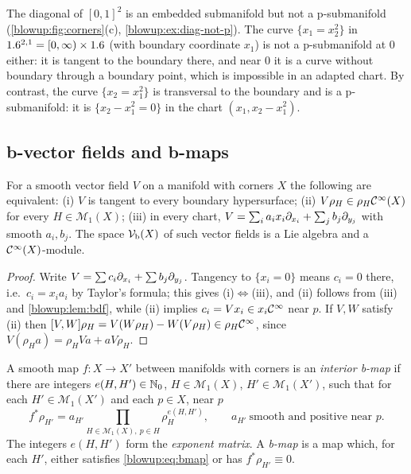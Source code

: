 \begin{example}
The diagonal of $[0,1]^2$ is an embedded submanifold but not a p-submanifold
(\cref{blowup:fig:corners}(c), \cref{blowup:ex:diag-not-p}). The curve $\{x_1=x_2^2\}$ in
$1.6^{2,1}=[0,\infty)\times1.6$ (with boundary coordinate $x_1$) is not a p-submanifold
at $0$ either: it is tangent to the boundary there, and near $0$ it is a curve without
boundary through a boundary point, which is impossible in an adapted chart. By contrast,
the curve $\{x_2=x_1^2\}$ is transversal to the boundary and is a p-submanifold: it is
$\{x_2-x_1^2=0\}$ in the chart $(x_1,x_2-x_1^2)$.
\end{example}

\subsection{b-vector fields and b-maps}
\begin{lemma}\label{blowup:lem:Vb}
For a smooth vector field $V$ on a manifold with corners $X$ the following are
equivalent: \textup{(i)} $V$ is tangent to every boundary hypersurface; \textup{(ii)}
$V\rho_H\in\rho_H\mathcal{C}^\infty(X)$ for every $H\in\mathcal M_1(X)$; \textup{(iii)} in every chart,
$V=\sum_ia_ix_i\partial_{x_i}+\sum_jb_j\partial_{y_j}$ with smooth $a_i,b_j$. The space $\mathcal{V}_{\mathrm{b}}(X)$ of
such vector fields is a Lie algebra and a $\mathcal{C}^\infty(X)$-module.
\end{lemma}
\begin{proof}
Write $V=\sum c_i\partial_{x_i}+\sum b_j\partial_{y_j}$. Tangency to $\{x_i=0\}$ means $c_i=0$ there,
i.e.\ $c_i=x_ia_i$ by Taylor's formula; this gives (i)$\iff$(iii), and (ii) follows from
(iii) and \cref{blowup:lem:bdf}, while (ii) implies $c_i=Vx_i\in x_i\mathcal{C}^\infty$ near $p$. If $V,W$
satisfy (ii) then $[V,W]\rho_H=V(W\rho_H)-W(V\rho_H)\in\rho_H\mathcal{C}^\infty$, since
$V(\rho_Ha)=\rho_HVa+aV\rho_H$.
\end{proof}

\begin{definition}\label{blowup:def:bmap}
A smooth map $f:X\to X'$ between manifolds with corners is an \emph{interior b-map} if
there are integers $e(H,H')\in\mathbb{N}_0$, $H\in\mathcal M_1(X)$, $H'\in\mathcal M_1(X')$, such that
for each $H'\in\mathcal M_1(X')$ and each $p\in X$, near $p$
\begin{equation}\label{blowup:eq:bmap}
  f^*\rho_{H'}=a_{H'}\prod_{H\in\mathcal M_1(X),\ p\in H}\rho_H^{e(H,H')},\qquad
  a_{H'}\ \text{smooth and positive near }p.
\end{equation}
The integers $e(H,H')$ form the \emph{exponent matrix}. A \emph{b-map} is a map which,
for each $H'$, either satisfies \eqref{blowup:eq:bmap} or has $f^*\rho_{H'}\equiv0$.
\end{definition}

